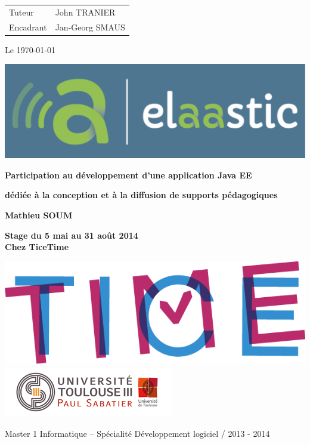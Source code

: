 \begin{titlepage}
\parindent=0pt
\begin{tabular}[h]{l@{ : }l}
  Tuteur & John TRANIER \\
  Encadrant & Jan-Georg SMAUS
\end{tabular} \hfill Le \today
\vspace{2cm}
\begin{center}
  \includegraphics[scale=0.5]{images/elaastic_blue.pdf}%
\end{center}
\vspace{2cm}
\hrulefill
\begin{center}\bfseries\Huge
  Participation au développement d’une application Java EE
\end{center}
\hrulefill
\begin{center}\bfseries\Large
  dédiée à la conception et à la diffusion de supports pédagogiques
\end{center}
\vspace*{0.5cm}
\begin{center}\bfseries\Large
  Mathieu SOUM
\end{center}
\vspace*{0.2cm}
\begin{center}\bfseries
  Stage du 5 mai au 31 août 2014\\Chez TiceTime
\end{center}
\vfill
\includegraphics[scale=0.25]{images/ticetime.png}%
\hfill
\includegraphics[scale=0.6]{images/logo.png}%
\vspace{1.7cm}
\begin{flushright}
  Master 1 Informatique -- Spécialité Développement logiciel / 2013 - 2014
\end{flushright}
  
\end{titlepage}
